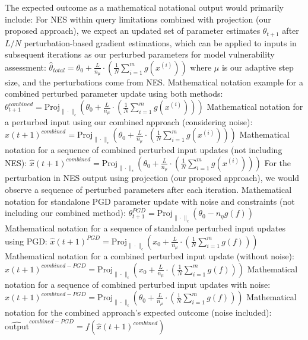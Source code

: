 The expected outcome as a mathematical notational output would primarily include:
For NES within query limitations combined with projection (our proposed approach), we expect an updated set of parameter estimates $\theta_{t+1}$ after $L/N$ perturbation-based gradient estimations, which can be applied to inputs in subsequent iterations as our perturbed parameters for model vulnerability assessment:
$\hat{\theta}_{total} = \theta_0 + \frac{L}{n_\mu} \cdot \left( \frac{1}{N} \sum_{i=1}^{m} g(x^{(i)}) \right)$
where $\mu$ is our adaptive step size, and the perturbations come from NES. 
Mathematical notation example for a combined perturbed parameter update using both methods:
$\theta_{t+1}^{combined} = \text{Proj}_{\|\cdot\|_{\epsilon}} \left( \theta_0 + \frac{L}{n_\mu} \cdot \left( \frac{1}{N} \sum_{i=1}^{m} g(x^{(i)}) \right) \right)$
Mathematical notation for a perturbed input using our combined approach (considering noise):
$\hat{x}(t+1)^{combined} = \text{Proj}_{\|\cdot\|_{\epsilon}} \left( \theta_0 + \frac{L}{n_\mu} \cdot \left( \frac{1}{N} \sum_{i=1}^{m} g(x^{(i)}) \right) \right)$
Mathematical notation for a sequence of combined perturbed input updates (not including NES):
$\hat{x}(t+1)^{combined} = \text{Proj}_{\|\cdot\|_{\epsilon}} \left( \theta_0 + \frac{L}{n_\mu} \cdot \left( \frac{1}{N} \sum_{i=1}^{m} g(x^{(i)}) \right) \right)$
For the perturbation in NES output using projection (our proposed approach), we would observe a sequence of perturbed parameters after each iteration. Mathematical notation for standalone PGD parameter update with noise and constraints (not including our combined method):
$\theta_{t+1}^{PGD} = \text{Proj}_{\|\cdot\|_{\epsilon}} \left( \theta_0 - n_\eta g(f) \right)$
Mathematical notation for a sequence of standalone perturbed input updates using PGD:
$\hat{x}(t+1)^{PGD} = \text{Proj}_{\|\cdot\|_{\epsilon}} \left( x_0 + \frac{L}{n_\mu} \cdot \left( \frac{1}{N} \sum_{i=1}^{m} g(f) \right) \right)$
Mathematical notation for a combined perturbed input update (without noise):
$\hat{x}(t+1)^{combined-PGD} = \text{Proj}_{\|\cdot\|_{\epsilon}} \left( x_0 + \frac{L}{n_\mu} \cdot \left( \frac{1}{N} \sum_{i=1}^{m} g(f) \right) \right)$
Mathematical notation for a sequence of combined perturbed input updates with noise:
$\hat{x}(t+1)^{combined-PGD} = \text{Proj}_{\|\cdot\|_{\epsilon}} \left( \theta_0 + \frac{L}{n_\mu} \cdot \left( \frac{1}{N} \sum_{i=1}^{m} g(f) \right) \right)$
Mathematical notation for the combined approach's expected outcome (noise included):
$\hat{\text{output}}^{combined-PGD} = f \left( \hat{x}(t+1)^{combined} \right)$
